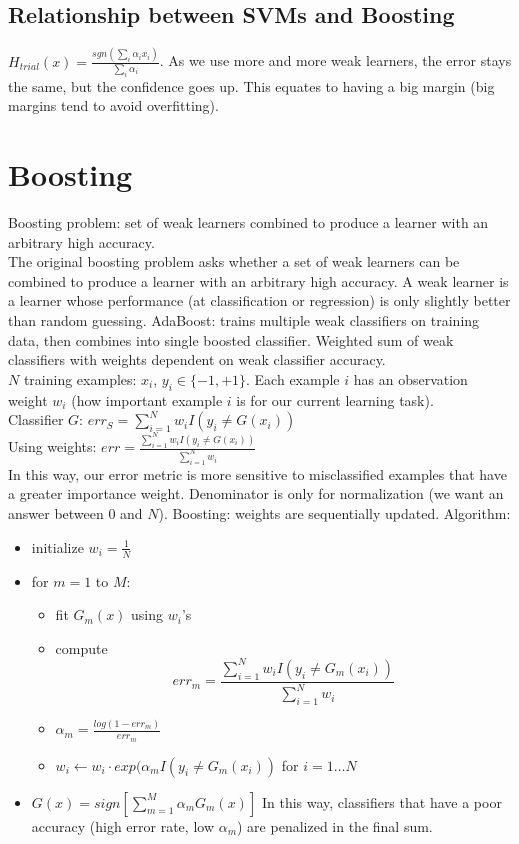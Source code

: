 \documentclass[11pt]{article}
\begin{document}
\subsection{Relationship between SVMs and Boosting}
$H_{trial} (x) = \frac{sgn(\sum_i{\alpha_i x_i})}{\sum_i \alpha_i}$. As we use more and more weak learners, the error stays the same, but the confidence goes up. This equates to having a big margin (big margins tend to avoid overfitting). 


\section{Boosting}
Boosting problem: set of weak learners combined to produce a learner with an arbitrary high accuracy.\\
The original boosting problem asks whether a set
of weak learners can be combined to produce a learner with an arbitrary
high accuracy. A weak learner is a learner whose performance (at
classification or regression) is only slightly better than random guessing.
AdaBoost: trains multiple weak classifiers on training data, then combines into single boosted classifier. Weighted sum of weak classifiers with weights dependent on weak classifier accuracy.\\
$N$ training examples: $x_i$, $y_i \in \{-1, +1\}$. Each example $i$ has an observation weight $w_i$ (how important example $i$ is for our current learning task).\\
Classifier $G$: $err_S = \sum_{i=1}^N{w_i I(y_i \neq G(x_i))}$ \\
Using weights: $err = \frac{\sum_{i=1}^N{w_i I(y_i \neq G(x_i))}}{\sum_{i=1}^N w_i}$\\
In this way, our error metric is more sensitive to misclassified examples
that have a greater importance weight. Denominator is only for normalization (we want an answer between 0 and $N$).
Boosting: weights are sequentially updated. Algorithm:\\
\begin{itemize}
\item initialize $w_i = \frac1N$
\item for $m =1$ to $M$:
\begin{itemize}
\item fit $G_m(x)$ using $w_i$'s
\item compute $$err_m = \frac{\sum_{i=1}^N{w_i I(y_i \neq G_m(x_i))}}{\sum_{i=1}^N w_i}$$
\item $\alpha_m = \frac{log(1-err_m)}{err_m}$
\item $w_i \leftarrow w_i \cdot exp(\alpha_m I(y_i \neq G_m(x_i))$ for $i = 1 \dots N$
\end{itemize}
\item $G(x) = sign [ \sum_{m=1}^M \alpha_m G_m(x)]$ In this way, classifiers that have a poor accuracy (high error rate, low $\alpha_m$) are penalized in the final sum.
\end{itemize}
\end{document}
